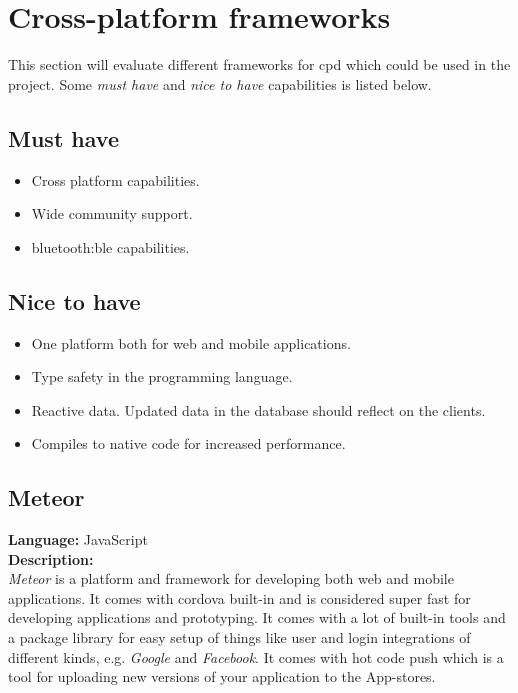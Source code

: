 \section{Cross-platform frameworks}

This section will evaluate different frameworks for \gls{cpd} which could be used in the project. 
Some \textit{must have} and \textit{nice to have} capabilities is listed below.
	
\subsection*{Must have}
	\begin{itemize}
	\item Cross platform capabilities.
	\item Wide community support.
	\item \gls{bluetooth:ble} capabilities.
	\end{itemize}
	
\subsection*{Nice to have}
	
	\begin{itemize}
	\item One platform both for web and mobile applications.
	\item Type safety in the programming language.
	\item Reactive data. Updated data in the database should reflect on the clients.
	\item Compiles to native code for increased performance.
	\end{itemize}
	

\subsection*{Meteor}
\textbf{Language:} JavaScript
\\
\textbf{Description:}
\\
\textit{Meteor} is a platform and framework for developing both web and mobile applications. 
It comes with \gls{cordova} built-in and is considered super fast for developing applications and prototyping. 
It comes with a lot of built-in tools and a package library for easy setup of things like user  and login integrations of different kinds, e.g. \textit{Google} and \textit{Facebook}. It comes with hot code push which is a tool for uploading new versions of your application to the App-stores.

